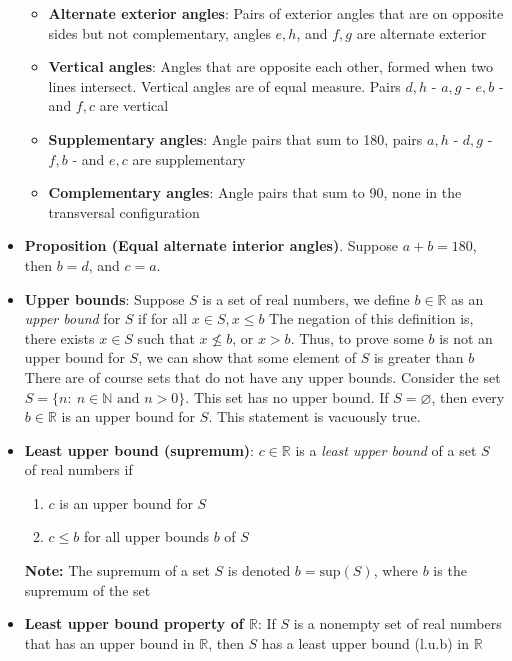 \documentclass{report}
\begin{document}
\begin{itemize}
\begin{itemize}
                \item \textbf{Alternate exterior angles}: Pairs of exterior angles that are on opposite sides but not complementary, angles $e,h$, and $f,g$ are alternate exterior
                \item \textbf{Vertical angles}: Angles that are opposite each other, formed when two lines intersect. Vertical angles are of equal measure. Pairs $d,h$ - $a,g$ - $e,b$ - and $f,c$ are vertical
                \item \textbf{Supplementary angles}: Angle pairs that sum to 180, pairs $a,h$ - $d,g$ - $f,b$ - and $e,c$ are supplementary
                \item \textbf{Complementary angles}: Angle pairs that sum to 90, none in the transversal configuration
            \end{itemize}
        \item \textbf{Proposition (Equal alternate interior angles)}. Suppose $a + b = 180$, then $b = d$, and $c=a $.
        \item \textbf{Upper bounds}: Suppose $S$ is a set of real numbers, we define $b \in \mathbb{R}$ as an \textit{upper bound} for $S$ if for all $x\in S, x \leq b$
            \bigbreak \noindent 
            The negation of this definition is, there exists $x\in S$ such that $x \nleq b$, or $x > b$. Thus, to prove some $b$ is not an upper bound for $S$, we can show that some element of $S$ is greater than $b$
            \bigbreak \noindent 
            There are of course  sets that do not have any upper bounds. Consider the set $S = \{n:\ n\in \mathbb{N} \text{ and } n>0\} $. This set has no upper bound.
            \bigbreak \noindent 
            If $S = \varnothing$, then every $b \in \mathbb{R}$ is an upper bound for $S$. This statement is vacuously true.
        \item \textbf{Least upper bound (supremum)}: $c\in \mathbb{R}$ is a \textit{least upper bound} of a set $S$ of real numbers if 
            \begin{enumerate}
                \item $c$ is an upper bound for $S$
                \item $c \leq b$ for all upper bounds $b$ of $S$
            \end{enumerate}
            \bigbreak \noindent 
            \textbf{Note:} The supremum of a set $S$ is denoted $ b = \text{sup}(S)$, where $b$ is the supremum of the set
        \item \textbf{Least upper bound property of $\mathbb{R}$}: If $S$ is a nonempty set of real numbers that has an upper bound in $\mathbb{R}$, then $S$ has a least upper bound (l.u.b) in $\mathbb{R} $

\end{itemize}
\end{document}

